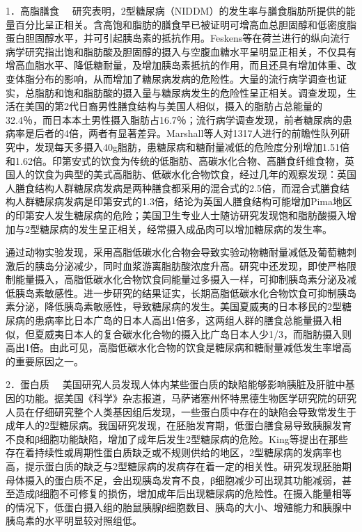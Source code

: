 {1．高脂膳食}
　研究表明，2型糖尿病（NIDDM）的发生率与膳食脂肪所提供的能量百分比呈正相关。含高饱和脂肪的膳食早已被证明可增高血总胆固醇和低密度脂蛋白胆固醇水平，并可引起胰岛素的抵抗作用。Feskens等在荷兰进行的纵向流行病学研究指出饱和脂肪酸及胆固醇的摄入与空腹血糖水平呈明显正相关，不仅具有增高血脂水平、降低糖耐量，及增加胰岛素抵抗的作用，而且还具有增加体重、改变体脂分布的影响，从而增加了糖尿病发病的危险性。大量的流行病学调查也证实，总脂肪和饱和脂肪酸的摄入量与糖尿病发生的危险性呈正相关。调查发现，生活在美国的第2代日裔男性膳食结构与美国人相似，摄入的脂肪占总能量的32.4％，而日本本土男性摄入脂肪占16.7％；流行病学调查发现，前者糖尿病的患病率是后者的4倍，两者有显著差异。Marshall等人对1317人进行的前瞻性队列研究中，发现每天多摄入40g脂肪，患糖尿病和糖耐量减低的危险度分别增加1.51倍和1.62倍。印第安式的饮食为传统的低脂肪、高碳水化合物、高膳食纤维食物，英国人的饮食为典型的美式高脂肪、低碳水化合物饮食，经过几年的观察发现：英国人膳食结构人群糖尿病发病是两种膳食都采用的混合式的2.5倍，而混合式膳食结构人群糖尿病发病是印第安式的1.3倍，结论为英国人膳食结构可能增加Pima地区的印第安人发生糖尿病的危险；美国卫生专业人士随访研究发现饱和脂肪酸摄入增加与2型糖尿病的发生呈正相关，经常摄入成品肉可以增加糖尿病的发生率。

通过动物实验发现，采用高脂低碳水化合物会导致实验动物糖耐量减低及葡萄糖刺激后的胰岛分泌减少，同时血浆游离脂肪酸浓度升高。研究中还发现，即使严格限制能量摄入，高脂低碳水化合物饮食同能量过多摄入一样，可抑制胰岛素分泌及减低胰岛素敏感性。进一步研究的结果证实，长期高脂低碳水化合物饮食可抑制胰岛素分泌，降低胰岛素敏感性，导致糖尿病的发生。美国夏威夷的日本移民的2型糖尿病的患病率比日本广岛的日本人高出1倍多，这两组人群的膳食总能量摄入相似，但夏威夷日本人的复合碳水化合物的摄入比广岛日本人少1/3，而脂肪摄入则高出1倍。由此可见，高脂低碳水化合物的饮食是糖尿病和糖耐量减低发生率增高的重要原因之一。

{2．蛋白质}
　美国研究人员发现人体内某些蛋白质的缺陷能够影响胰脏及肝脏中基因的功能。据美国《科学》杂志报道，马萨诸塞州怀特黑德生物医学研究院的研究人员在仔细研究整个人类基因组后发现，一些蛋白质中存在的缺陷会导致常发生于成年人的2型糖尿病。我国研究发现，在胚胎发育期，低蛋白膳食易导致胰腺发育不良和β细胞功能缺陷，增加了成年后发生2型糖尿病的危险。King等提出在那些存在着持续性或周期性蛋白质缺乏或不规则供给的地区，2型糖尿病的发病率也高，提示蛋白质的缺乏与2型糖尿病的发病存在着一定的相关性。研究发现胚胎期母体摄入的蛋白质不足，会出现胰岛发育不良，β细胞减少可出现其功能减弱，甚至造成β细胞不可修复的损伤，增加成年后出现糖尿病的危险性。在摄入能量相等的情况下，低蛋白摄入组的胎鼠胰腺β细胞数目、胰岛的大小、增殖能力和胰腺中胰岛素的水平明显较对照组低。

